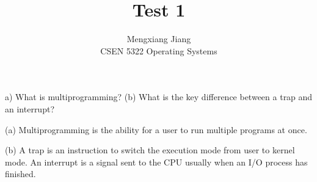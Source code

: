 \documentclass[12pt]{article}
\newenvironment{problem}[2][Problem]{\begin{trivlist}
\item[\hskip \labelsep {\bfseries #1}\hskip \labelsep {\bfseries #2.}]}{\end{trivlist}}
\begin{document}
 
 
\title{Test 1}%
\author{Mengxiang Jiang\\ %
CSEN 5322 Operating Systems} %
 
\maketitle
 
\begin{problem}{1} %
    (a) What is multiprogramming? (b) What is the key difference between a trap
    and an interrupt?

    (a) Multiprogramming is the ability for a user to run multiple programs at once.

    (b) A trap is an instruction to switch the execution mode from user to kernel mode. An interrupt is a signal sent to the CPU usually when an I/O process has finished.

\end{problem}
\end{document}
